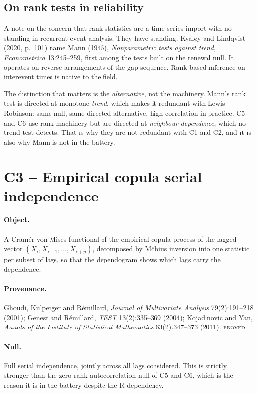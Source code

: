 \documentclass[11pt,a4paper]{article}
\newcommand{\PROVED}{\textsc{\textcolor{blue!55!black}{proved}}}
\begin{document}
\subsection{On rank tests in reliability}

A note on the concern that rank statistics are a time-series import with no standing in
recurrent-event analysis. They have standing. Kvaløy and Lindqvist (2020, p.~101) name
Mann (1945), \emph{Nonparametric tests against trend}, \emph{Econometrica} 13:245--259,
first among the tests built on the renewal null. It operates on reverse arrangements of
the gap sequence. Rank-based inference on interevent times is native to the field.

The distinction that matters is the \emph{alternative}, not the machinery. Mann's rank
test is directed at monotone \emph{trend}, which makes it redundant with Lewis-Robinson:
same null, same directed alternative, high correlation in practice. C5 and C6 use rank
machinery but are directed at \emph{neighbour dependence}, which no trend test detects.
That is why they are not redundant with C1 and C2, and it is also why Mann is not in the
battery.

\section{C3 -- Empirical copula serial independence}

\paragraph{Object.} A Cramér-von Mises functional of the empirical copula process of the
lagged vector $(X_i, X_{i+1}, \dots, X_{i+p})$, decomposed by Möbius inversion into
one statistic per subset of lags, so that the dependogram shows which lags carry the
dependence.

\paragraph{Provenance.} Ghoudi, Kulperger and Rémillard, \emph{Journal of Multivariate
Analysis} 79(2):191--218 (2001); Genest and Rémillard, \emph{TEST} 13(2):335--369
(2004); Kojadinovic and Yan, \emph{Annals of the Institute of Statistical Mathematics}
63(2):347--373 (2011). \PROVED

\paragraph{Null.} Full serial independence, jointly across all lags considered. This is
strictly stronger than the zero-rank-autocorrelation null of C5 and C6, which is the
reason it is in the battery despite the R dependency.
\end{document}
